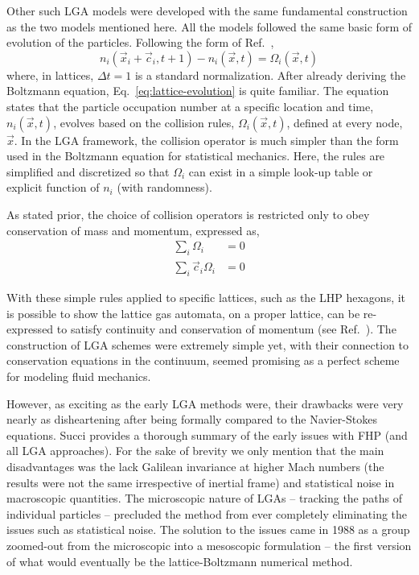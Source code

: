 Other such LGA models were developed with the same fundamental construction as the two models mentioned here. All the models followed the same basic form of evolution of the particles. Following the form of Ref.~\cite{chopard1998cellular},
\begin{equation}\label{eq:lattice-evolution}
	n_i(\vec{x}_i + \vec{c}_i,t+1) - n_i(\vec{x},t) = \Omega_i(\vec{x},t)
\end{equation}
where, in lattices, $\Delta t = 1$ is a standard normalization. After already deriving the Boltzmann equation, Eq.~\ref{eq:lattice-evolution} is quite familiar. The equation states that the particle occupation number at a specific location and time, $n_i(\vec{x},t)$, evolves based on the collision rules, $\Omega_i(\vec{x},t)$, defined at every node, $\vec{x}$. In the LGA framework, the collision operator is much simpler than the form used in the Boltzmann equation for statistical mechanics. Here, the rules are simplified and discretized so that $\Omega_i$ can exist in a simple look-up table or explicit function of $n_i$ (with randomness).\cite{chopard1998cellular,Sukop2007}

As stated prior, the choice of collision operators is restricted only to obey conservation of mass and momentum, expressed as,
\begin{subequations}
\begin{align}
	\sum_i\Omega_i &= 0\\
	\sum_i\vec{c}_i\Omega_i&=0
\end{align}
\end{subequations}

With these simple rules applied to specific lattices, such as the LHP hexagons, it is possible to show the lattice gas automata, on a proper lattice, can be re-expressed to satisfy continuity and conservation of momentum (see Ref.~\cite{Viggen2009,Frisch1986}). The construction of LGA schemes were extremely simple yet, with their connection to conservation equations in the continuum, seemed promising as a perfect scheme for modeling fluid mechanics.

However, as exciting as the early LGA methods were, their drawbacks were very nearly as disheartening after being formally compared to the Navier-Stokes equations. Succi provides a thorough summary of the early issues with FHP (and all LGA approaches).\cite{succi2001lattice} For the sake of brevity we only mention that the main disadvantages was the lack Galilean invariance at higher Mach numbers (the results were not the same irrespective of inertial frame) and statistical noise in macroscopic quantities. The microscopic nature of LGAs -- tracking the paths of individual particles -- precluded the method from ever completely eliminating the issues such as statistical noise. The solution to the issues came in 1988 as a group zoomed-out from the microscopic into a mesoscopic formulation -- the first version of what would eventually be the lattice-Boltzmann numerical method.



